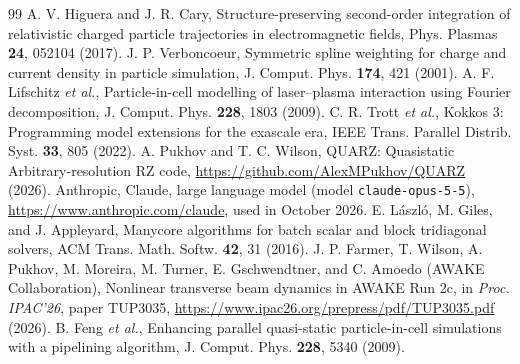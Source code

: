 \documentclass[aps,prab,reprint,floatfix,superscriptaddress,amsmath,amssymb]{revtex4-2}
\begin{document}
\begin{thebibliography}{99}
 A. V. Higuera and J. R. Cary, Structure-preserving second-order integration of relativistic charged particle trajectories in electromagnetic fields, Phys. Plasmas \textbf{24}, 052104 (2017).
 J. P. Verboncoeur, Symmetric spline weighting for charge and current density in particle simulation, J. Comput. Phys. \textbf{174}, 421 (2001).
 A. F. Lifschitz \textit{et al.}, Particle-in-cell modelling of laser--plasma interaction using Fourier decomposition, J. Comput. Phys. \textbf{228}, 1803 (2009).
 C. R. Trott \textit{et al.}, Kokkos 3: Programming model extensions for the exascale era, IEEE Trans. Parallel Distrib. Syst. \textbf{33}, 805 (2022).
 A. Pukhov and T. C. Wilson, QUARZ: Quasistatic Arbitrary-resolution RZ code, \url{https://github.com/AlexMPukhov/QUARZ} (2026).
 Anthropic, Claude, large language model (model \texttt{claude-opus-5-5}), \url{https://www.anthropic.com/claude}, used in October 2026.
 E. L\'aszl\'o, M. Giles, and J. Appleyard, Manycore algorithms for batch scalar and block tridiagonal solvers, ACM Trans. Math. Softw. \textbf{42}, 31 (2016).
 J. P. Farmer, T. Wilson, A. Pukhov, M. Moreira, M. Turner, E. Gschwendtner, and C. Amoedo (AWAKE Collaboration), Nonlinear transverse beam dynamics in AWAKE Run 2c, in \textit{Proc. IPAC'26}, paper TUP3035, \url{https://www.ipac26.org/prepress/pdf/TUP3035.pdf} (2026).
 B. Feng \textit{et al.}, Enhancing parallel quasi-static particle-in-cell simulations with a pipelining algorithm, J. Comput. Phys. \textbf{228}, 5340 (2009).
\end{thebibliography}
\end{document}
